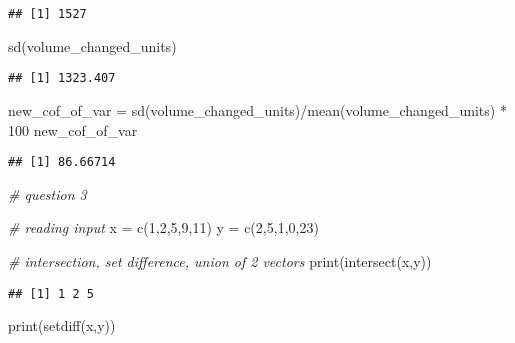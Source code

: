 \documentclass[
]{article}
\newenvironment{Shaded}{\begin{snugshade}}{\end{snugshade}}
\newcommand{\CommentTok}[1]{\textcolor[rgb]{0.56,0.35,0.01}{\textit{#1}}}
\newcommand{\DecValTok}[1]{\textcolor[rgb]{0.00,0.00,0.81}{#1}}
\newcommand{\FunctionTok}[1]{\textcolor[rgb]{0.00,0.00,0.00}{#1}}
\newcommand{\NormalTok}[1]{#1}
\newcommand{\OtherTok}[1]{\textcolor[rgb]{0.56,0.35,0.01}{#1}}
\newcommand{\SpecialCharTok}[1]{\textcolor[rgb]{0.00,0.00,0.00}{#1}}
\begin{document}
\begin{verbatim}
## [1] 1527
\end{verbatim}

\begin{Shaded}
\begin{Highlighting}[]
\FunctionTok{sd}\NormalTok{(volume\_changed\_units)}
\end{Highlighting}
\end{Shaded}

\begin{verbatim}
## [1] 1323.407
\end{verbatim}

\begin{Shaded}
\begin{Highlighting}[]
\NormalTok{new\_cof\_of\_var }\OtherTok{=} \FunctionTok{sd}\NormalTok{(volume\_changed\_units)}\SpecialCharTok{/}\FunctionTok{mean}\NormalTok{(volume\_changed\_units) }\SpecialCharTok{*} \DecValTok{100}
\NormalTok{new\_cof\_of\_var}
\end{Highlighting}
\end{Shaded}

\begin{verbatim}
## [1] 86.66714
\end{verbatim}

\begin{Shaded}
\begin{Highlighting}[]
\CommentTok{\# question 3}

\CommentTok{\# reading input}
\NormalTok{x }\OtherTok{=} \FunctionTok{c}\NormalTok{(}\DecValTok{1}\NormalTok{,}\DecValTok{2}\NormalTok{,}\DecValTok{5}\NormalTok{,}\DecValTok{9}\NormalTok{,}\DecValTok{11}\NormalTok{)}
\NormalTok{y }\OtherTok{=} \FunctionTok{c}\NormalTok{(}\DecValTok{2}\NormalTok{,}\DecValTok{5}\NormalTok{,}\DecValTok{1}\NormalTok{,}\DecValTok{0}\NormalTok{,}\DecValTok{23}\NormalTok{)}

\CommentTok{\# intersection, set difference, union of 2 vectors}
\FunctionTok{print}\NormalTok{(}\FunctionTok{intersect}\NormalTok{(x,y))}
\end{Highlighting}
\end{Shaded}

\begin{verbatim}
## [1] 1 2 5
\end{verbatim}

\begin{Shaded}
\begin{Highlighting}[]
\FunctionTok{print}\NormalTok{(}\FunctionTok{setdiff}\NormalTok{(x,y))}
\end{Highlighting}
\end{Shaded}
\end{document}
